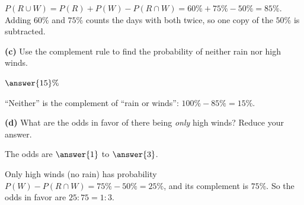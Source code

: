 \documentclass[12pt]{ximera}
\begin{document}
\begin{problem}
\begin{prompt}
\begin{feedback}
$P(R\cup W)=P(R)+P(W)-P(R\cap W)=60\%+75\%-50\%=85\%$. Adding $60\%$ and $75\%$ counts
the days with both twice, so one copy of the $50\%$ is subtracted.
\end{feedback}
\end{prompt}

\begin{prompt}
\textbf{(c)} Use the complement rule to find the probability of neither rain nor high
winds.

$\answer{15}\%$

\begin{feedback}
``Neither'' is the complement of ``rain or winds'': $100\%-85\%=15\%$.
\end{feedback}
\end{prompt}

\begin{prompt}
\textbf{(d)} What are the odds in favor of there being \emph{only} high winds? Reduce
your answer.

The odds are $\answer{1}$ to $\answer{3}$.

\begin{feedback}
Only high winds (no rain) has probability $P(W)-P(R\cap W)=75\%-50\%=25\%$, and its
complement is $75\%$. So the odds in favor are $25:75=1:3$.
\end{feedback}
\end{prompt}
\end{problem}
\end{document}
